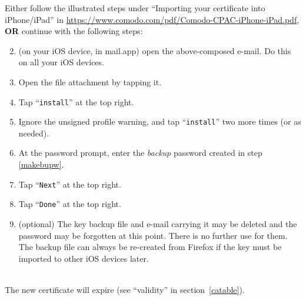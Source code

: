 \documentclass[pdftex,12pt,titlepage=false]{scrartcl}
\begin{document}
Either follow the illustrated steps under ``Importing your certificate
into iPhone/iPad'' in
\url{https://www.comodo.com/pdf/Comodo-CPAC-iPhone-iPad.pdf},
\textbf{OR} continue with the following steps:\\
\begin{minipage}{\textwidth}%
  \begin{multicols}{2}
    \begin{enumerate}\setcounter{enumi}{1}
    \item (on your iOS device, in mail.app) open the above-composed e-mail.
      Do this on all your iOS devices.
    \item Open the file attachment by tapping it.
    \item Tap ``\verb|install|'' at the top right.
    \item Ignore the unsigned profile warning, and tap ``\verb|install|''
      two more times (or as needed).
    \item At the password prompt, enter the \emph{backup} password created
      in step \ref{makebupw}.
    \item Tap ``\verb|Next|'' at the top right.
    \item Tap ``\verb|Done|'' at the top right.
    \item (optional) The key backup file and e-mail carrying it
      may be deleted and the password may be forgotten at this point.
      There is no further use for them.  The backup file can always be
      re-created from Firefox if the key must be imported to other
      iOS devices later.
    \end{enumerate}
  \end{multicols}
\end{minipage}\\[1em]

The new certificate will expire (see ``validity'' in section~\ref{catable}).
\end{document}
